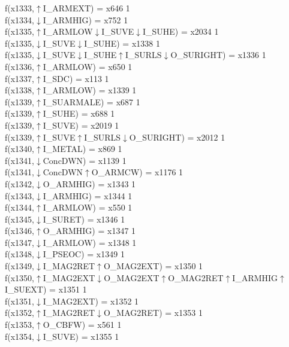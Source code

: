 f(x1333,$\uparrow$I\_ARMEXT) = x646 {1} \\
f(x1334,$\downarrow$I\_ARMHIG) = x752 {1} \\
f(x1335,$\uparrow$I\_ARMLOW$\downarrow$I\_SUVE$\downarrow$I\_SUHE) = x2034 {1} \\
f(x1335,$\downarrow$I\_SUVE$\downarrow$I\_SUHE) = x1338 {1} \\
f(x1335,$\downarrow$I\_SUVE$\downarrow$I\_SUHE$\uparrow$I\_SURLS$\downarrow$O\_SURIGHT) = x1336 {1} \\
f(x1336,$\uparrow$I\_ARMLOW) = x650 {1} \\
f(x1337,$\uparrow$I\_SDC) = x113 {1} \\
f(x1338,$\uparrow$I\_ARMLOW) = x1339 {1} \\
f(x1339,$\uparrow$I\_SUARMALE) = x687 {1} \\
f(x1339,$\uparrow$I\_SUHE) = x688 {1} \\
f(x1339,$\uparrow$I\_SUVE) = x2019 {1} \\
f(x1339,$\uparrow$I\_SUVE$\uparrow$I\_SURLS$\downarrow$O\_SURIGHT) = x2012 {1} \\
f(x1340,$\uparrow$I\_METAL) = x869 {1} \\
f(x1341,$\downarrow$ConcDWN) = x1139 {1} \\
f(x1341,$\downarrow$ConcDWN$\uparrow$O\_ARMCW) = x1176 {1} \\
f(x1342,$\downarrow$O\_ARMHIG) = x1343 {1} \\
f(x1343,$\downarrow$I\_ARMHIG) = x1344 {1} \\
f(x1344,$\uparrow$I\_ARMLOW) = x550 {1} \\
f(x1345,$\downarrow$I\_SURET) = x1346 {1} \\
f(x1346,$\uparrow$O\_ARMHIG) = x1347 {1} \\
f(x1347,$\downarrow$I\_ARMLOW) = x1348 {1} \\
f(x1348,$\downarrow$I\_PSEOC) = x1349 {1} \\
f(x1349,$\downarrow$I\_MAG2RET$\uparrow$O\_MAG2EXT) = x1350 {1} \\
f(x1350,$\uparrow$I\_MAG2EXT$\downarrow$O\_MAG2EXT$\uparrow$O\_MAG2RET$\uparrow$I\_ARMHIG$\uparrow$I\_SUEXT) = x1351 {1} \\
f(x1351,$\downarrow$I\_MAG2EXT) = x1352 {1} \\
f(x1352,$\uparrow$I\_MAG2RET$\downarrow$O\_MAG2RET) = x1353 {1} \\
f(x1353,$\uparrow$O\_CBFW) = x561 {1} \\
f(x1354,$\downarrow$I\_SUVE) = x1355 {1} \\
